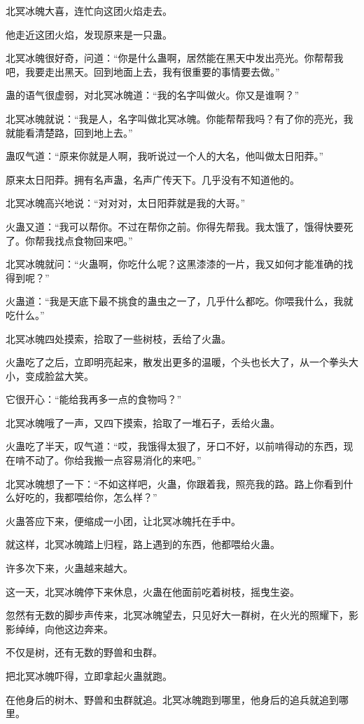 \begin{this_body}
北冥冰魄大喜，连忙向这团火焰走去。

他走近这团火焰，发现原来是一只蛊。

北冥冰魄很好奇，问道：“你是什么蛊啊，居然能在黑天中发出亮光。你帮帮我吧，我要走出黑天。回到地面上去，我有很重要的事情要去做。”

蛊的语气很虚弱，对北冥冰魄道：“我的名字叫做火。你又是谁啊？”

北冥冰魄就说：“我是人，名字叫做北冥冰魄。你能帮帮我吗？有了你的亮光，我就能看清楚路，回到地上去。”

蛊叹气道：“原来你就是人啊，我听说过一个人的大名，他叫做太日阳莽。”

原来太日阳莽。拥有名声蛊，名声广传天下。几乎没有不知道他的。

北冥冰魄高兴地说：“对对对，太日阳莽就是我的大哥。”

火蛊又道：“我可以帮你。不过在帮你之前。你得先帮我。我太饿了，饿得快要死了。你帮我找点食物回来吧。”

北冥冰魄就问：“火蛊啊，你吃什么呢？这黑漆漆的一片，我又如何才能准确的找得到呢？”

火蛊道：“我是天底下最不挑食的蛊虫之一了，几乎什么都吃。你喂我什么，我就吃什么。”

北冥冰魄四处摸索，拾取了一些树枝，丢给了火蛊。

火蛊吃了之后，立即明亮起来，散发出更多的温暖，个头也长大了，从一个拳头大小，变成脸盆大笑。

它很开心：“能给我再多一点的食物吗？”

北冥冰魄哦了一声，又四下摸索，拾取了一堆石子，丢给火蛊。

火蛊吃了半天，叹气道：“哎，我饿得太狠了，牙口不好，以前啃得动的东西，现在啃不动了。你给我搬一点容易消化的来吧。”

北冥冰魄想了一下：“不如这样吧，火蛊，你跟着我，照亮我的路。路上你看到什么好吃的，我都喂给你，怎么样？”

火蛊答应下来，便缩成一小团，让北冥冰魄托在手中。

就这样，北冥冰魄踏上归程，路上遇到的东西，他都喂给火蛊。

许多次下来，火蛊越来越大。

这一天，北冥冰魄停下来休息，火蛊在他面前吃着树枝，摇曳生姿。

忽然有无数的脚步声传来，北冥冰魄望去，只见好大一群树，在火光的照耀下，影影绰绰，向他这边奔来。

不仅是树，还有无数的野兽和虫群。

把北冥冰魄吓得，立即拿起火蛊就跑。

在他身后的树木、野兽和虫群就追。北冥冰魄跑到哪里，他身后的追兵就追到哪里。


\end{this_body}
